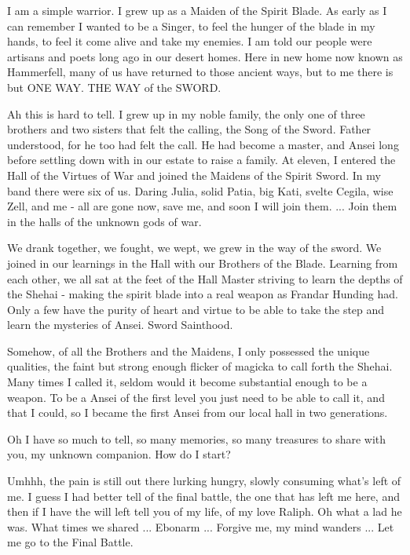I am a simple warrior. I grew up as a Maiden of the Spirit Blade. As early as I can remember I wanted to be a Singer, to feel the hunger of the blade in my hands, to feel it come alive and take my enemies. I am told our people were artisans and poets long ago in our desert homes. Here in new home now known as Hammerfell, many of us have returned to those ancient ways, but to me there is but ONE WAY. THE WAY of the SWORD.

Ah this is hard to tell. I grew up in my noble family, the only one of three brothers and two sisters that felt the calling, the Song of the Sword. Father understood, for he too had felt the call. He had become a master, and Ansei long before settling down with in our estate to raise a family. At eleven, I entered the Hall of the Virtues of War and joined the Maidens of the Spirit Sword. In my band there were six of us. Daring Julia, solid Patia, big Kati, svelte Cegila, wise Zell, and me - all are gone now, save me, and soon I will join them. ... Join them in the halls of the unknown gods of war.

We drank together, we fought, we wept, we grew in the way of the sword. We joined in our learnings in the Hall with our Brothers of the Blade. Learning from each other, we all sat at the feet of the Hall Master striving to learn the depths of the Shehai - making the spirit blade into a real weapon as Frandar Hunding had. Only a few have the purity of heart and virtue to be able to take the step and learn the mysteries of Ansei. Sword Sainthood.

Somehow, of all the Brothers and the Maidens, I only possessed the unique qualities, the faint but strong enough flicker of magicka to call forth the Shehai. Many times I called it, seldom would it become substantial enough to be a weapon. To be a Ansei of the first level you just need to be able to call it, and that I could, so I became the first Ansei from our local hall in two generations.

Oh I have so much to tell, so many memories, so many treasures to share with you, my unknown companion. How do I start?

Umhhh, the pain is still out there lurking hungry, slowly consuming what's left of me. I guess I had better tell of the final battle, the one that has left me here, and then if I have the will left tell you of my life, of my love Raliph. Oh what a lad he was. What times we shared ... Ebonarm ... Forgive me, my mind wanders ... Let me go to the Final Battle.

